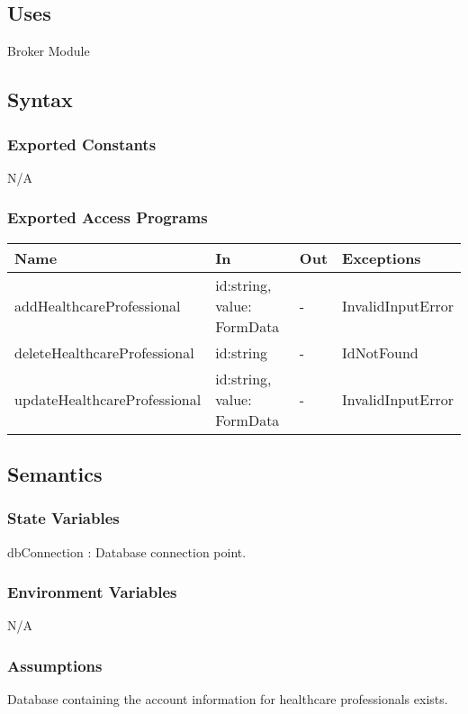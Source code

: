 \documentclass[12pt, titlepage]{article}
\begin{document}
\subsection{Uses}
Broker Module\\

\subsection{Syntax}

\subsubsection{Exported Constants}
N/A

\subsubsection{Exported Access Programs}

\begin{center}
\begin{tabular}{p{2cm} p{4cm} p{4cm} p{2cm}}
\hline
\textbf{Name} & \textbf{In} & \textbf{Out} & \textbf{Exceptions} \\
\hline
addHealthcareProfessional & id:string, value: FormData & - & InvalidInputError \\
deleteHealthcareProfessional & id:string & - & IdNotFound\\
updateHealthcareProfessional & id:string, value: FormData & - & InvalidInputError \\
\hline
\end{tabular}
\end{center}

\subsection{Semantics}

\subsubsection{State Variables}
dbConnection : Database connection point.

\subsubsection{Environment Variables}
N/A

\subsubsection{Assumptions}
Database containing the account information for healthcare professionals exists.
\end{document}
